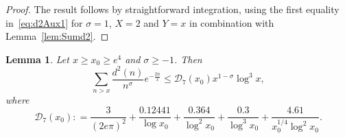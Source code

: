 \documentclass[a4paper,reqno]{amsart}
\newtheorem{lemma}[theorem]{Lemma}
\theoremstyle{definition}
\newcommand{\de}[0]{\mathrel{\mathop:}=}
\begin{document}
\begin{proof}
The result follows by straightforward integration, using the first equality in~\eqref{eq:d2Aux1} for $\sigma=1$, $X=2$ and $Y=x$ in combination with Lemma~\ref{lem:Sumd2}.
\end{proof}

\begin{lemma}
\label{lem:d2Exp2}
Let $x\geq x_0\geq e^{4}$ and $\sigma\geq -1$. Then
\begin{equation*}
\sum_{n>x}\frac{d^{2}(n)}{n^\sigma}e^{-\frac{2n}{x}} \leq \mathcal{D}_{7}(x_0)x^{1-\sigma}\log^{3}{x},
\end{equation*}
where
\begin{equation}
\label{eq:D7}
\mathcal{D}_{7}(x_0)\de \frac{3}{(2e\pi)^2} + \frac{0.12441}{\log{x_0}} + \frac{0.364}{\log^{2}{x_0}} + \frac{0.3}{\log^{3}{x_0}} + \frac{4.61}{x_0^{1/4}\log^{2}{x_0}}.
\end{equation}
\end{lemma}
\end{document}
